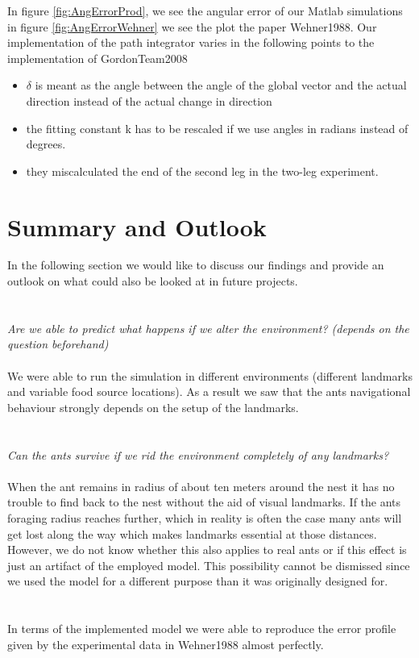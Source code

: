 \documentclass[11pt]{article}
\begin{document}
In figure \ref{fig:AngErrorProd}, we see the angular error of our Matlab simulations in figure \ref{fig:AngErrorWehner} we see the plot the paper Wehner1988\cite{Wehner1988}. Our implementation of the path integrator varies in the following points to the implementation of GordonTeam2008 \cite{GordonTeam2008}

\begin{itemize}
\item $\delta$ is meant as the angle between the angle of the global vector and the actual direction instead of the actual change in direction
\item the fitting constant k has to be rescaled if we use angles in radians instead of degrees.
\item they miscalculated the end of the second leg in the two-leg experiment.
\end{itemize}




\section{Summary and Outlook}
In the following section we would like to discuss our findings and provide an outlook on what could also be looked at in future projects.\\
\\ \\
\textit{Are we able to predict what happens if we alter the environment? (depends on the question beforehand) } \\ \\
We were able to run the simulation in different environments (different landmarks and variable food source locations). As a result we saw that the ants navigational behaviour strongly depends on the setup of the landmarks.
\\ \\ \\
\textit{Can the ants survive if we rid the environment completely of any landmarks?}
\\ \\
When the ant remains in radius of about ten meters around the nest it has no trouble to find back to the nest without the aid of visual landmarks. If the ants foraging radius reaches further, which in reality is often the case many ants will get lost along the way which makes landmarks essential at those distances. However, we do not know whether this also applies to real ants or if this effect is just an artifact of the employed model. This possibility cannot be dismissed since we used the model for a different purpose than it was originally designed for.
\\ \\ \\
In terms of the implemented model we were able to reproduce the error profile given by the experimental data in Wehner1988 \cite{Wehner1988} almost perfectly.
\end{document}
